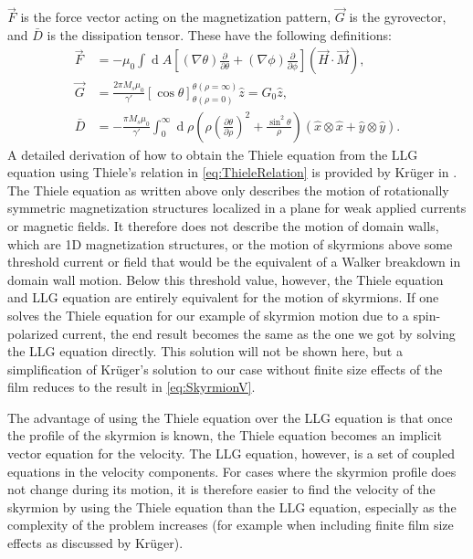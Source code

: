 \documentclass[12pt, a4paper, twoside, openright]{article}		%
\renewcommand{\d}[1]{\ensuremath{\operatorname{d}\!{#1}}}
\numberwithin{equation}{section}
\begin{document}
$\vec{F}$ is the force vector acting on the magnetization pattern, $\vec{G}$ is the gyrovector, and $\bar{D}$ is the dissipation tensor. These have the following definitions:
\begin{align}
\vec{F} &= -\mu_0 \int\d A \left[(\nabla\theta)\frac{\partial}{\partial \theta} + (\nabla\phi)\frac{\partial}{\partial \phi}\right] (\vec{H}\cdot\vec{M}),\label{eq:ThieleForce} \\
\vec{G} &= \frac{2\pi M_s\mu_0}{\gamma'}\left[\cos\theta\right]_{\theta(\rho = 0)}^{\theta(\rho=\infty)} \hat{z} = G_0 \hat{z}, \label{eq:ThieleGyro} \\
\bar{D} &= -\frac{\pi M_s\mu_0}{\gamma'}\int_0^{\infty}\d \rho \left(\rho \left(\frac{\partial \theta}{\partial \rho}\right)^2+\frac{\sin^2\theta}{\rho}\right)(\hat{x}\otimes\hat{x}+\hat{y}\otimes\hat{y}). \label{eq:ThieleDissipation}
\end{align}
A detailed derivation of how to obtain the Thiele equation from the LLG equation using Thiele's relation in \eqref{eq:ThieleRelation} is provided by Kr\"{u}ger in \cite{krugerDissertation}. The Thiele equation as written above only describes the motion of rotationally symmetric magnetization structures localized in a plane for weak applied currents or magnetic fields. It therefore does not describe the motion of domain walls, which are 1D magnetization structures, or the motion of skyrmions above some threshold current or field that would be the equivalent of a Walker breakdown in domain wall motion. Below this threshold value, however, the Thiele equation and LLG equation are entirely equivalent for the motion of skyrmions. If one solves the Thiele equation for our example of skyrmion motion due to a spin-polarized current, the end result becomes the same as the one we got by solving the LLG equation directly. This solution will not be shown here, but a simplification of Kr\"{u}ger's solution to our case without finite size effects of the film reduces to the result in \eqref{eq:SkyrmionV}.

The advantage of using the Thiele equation over the LLG equation is that once the profile of the skyrmion is known, the Thiele equation becomes an implicit vector equation for the velocity. The LLG equation, however, is a set of coupled equations in the velocity components. For cases where the skyrmion profile does not change during its motion, it is therefore easier to find the velocity of the skyrmion by using the Thiele equation than the LLG equation, especially as the complexity of the problem increases (for example when including finite film size effects as discussed by Kr\"{u}ger).
\end{document}
